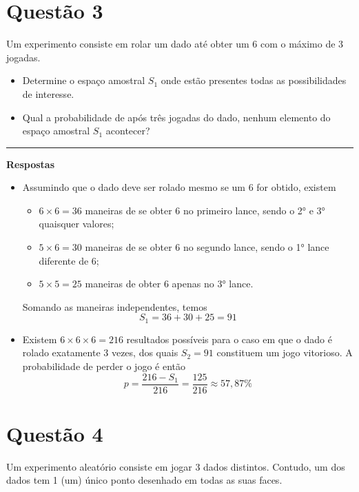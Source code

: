 \documentclass{article}
\begin{document}
\section*{\sffamily Questão 3}
Um experimento consiste em rolar um dado até obter um 6 com o máximo de 3 jogadas.

\begin{itemize}
\item [a)] Determine o espaço amostral $S_1$ onde estão presentes todas as possibilidades de interesse.

\item [b)] Qual a probabilidade de após três jogadas do dado, nenhum elemento do espaço amostral $S_1$ acontecer?
\end{itemize}
\rule{\linewidth}{0.5pt}

\textbf{\sffamily Respostas}

\begin{itemize}
\item [a)] 
Assumindo que o dado deve ser rolado mesmo se um 6 for obtido, existem
\begin{itemize}
    \item $6 \times 6 = 36$ maneiras de se obter 6 no primeiro lance, sendo o 2° e 3° quaisquer valores;
    \item $5 \times 6 = 30$ maneiras de se obter 6 no segundo lance, sendo o 1° lance diferente de 6;
    \item $5\times 5 = 25$ maneiras de obter 6 apenas no 3° lance.
\end{itemize}
Somando as maneiras independentes, temos
%
\begin{equation*}
\boxed{
    S_1 = 36 + 30 + 25 
        = 91
}
\end{equation*}

\item [b)] 
Existem $6 \times 6 \times 6 = 216$ resultados possíveis para o caso em que o dado é rolado exatamente 3 vezes, dos quais $S_2=91$ constituem um jogo vitorioso.
A probabilidade de perder o jogo é então
%
\begin{equation*}
\boxed{
    p = \frac{216 - S_1}{216}
      = \frac{125}{216}
      \approx 57,87\%
}
\end{equation*}
\end{itemize}

\section*{\sffamily Questão 4}
Um experimento aleatório consiste em jogar 3 dados distintos. Contudo, um dos dados tem 1 (um)
único ponto desenhado em todas as suas faces.
\end{document}

